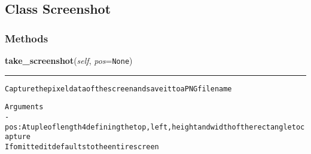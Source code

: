 

\subsection{Class Screenshot}

    \label{lib:screenshot:Screenshot}


  \subsubsection{Methods}

    \label{lib:screenshot:Screenshot:take_screenshot}

    \vspace{0.5ex}

\hspace{.8\funcindent}\begin{boxedminipage}{\funcwidth}

    \raggedright \textbf{take\_screenshot}(\textit{self}, \textit{pos}={\tt None})

    \vspace{-1.5ex}

    \rule{\textwidth}{0.5\fboxrule}
\setlength{\parskip}{2ex}
\begin{alltt}

Capture the pixel data of the screen and save it to a PNG filename

Arguments
- pos: A tuple of length 4 defining the top, left, height and width of the rectangle to capture
If omitted it defaults to the entire screen
\end{alltt}

\setlength{\parskip}{1ex}
    \end{boxedminipage}

